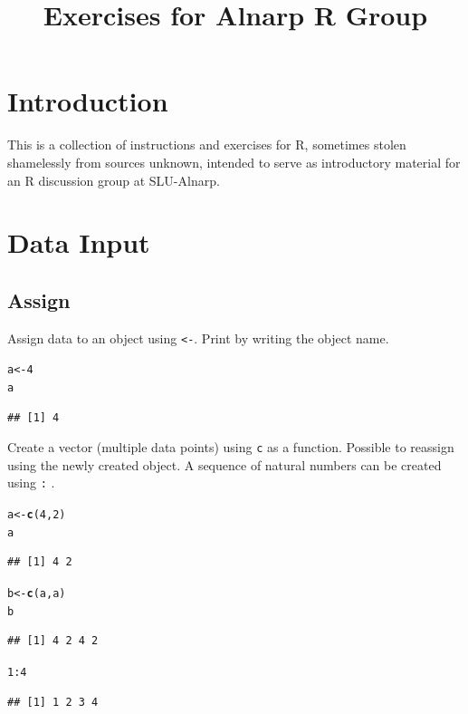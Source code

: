 \documentclass{article}\usepackage[]{graphicx}\usepackage[]{color}
\title{Exercises for Alnarp R Group}
\makeatletter
\newcommand{\hlnum}[1]{\textcolor[rgb]{0.686,0.059,0.569}{#1}}%
\newcommand{\hlopt}[1]{\textcolor[rgb]{0,0,0}{#1}}%
\newcommand{\hlstd}[1]{\textcolor[rgb]{0.345,0.345,0.345}{#1}}%
\newcommand{\hlkwb}[1]{\textcolor[rgb]{0.69,0.353,0.396}{#1}}%
\newcommand{\hlkwd}[1]{\textcolor[rgb]{0.737,0.353,0.396}{\textbf{#1}}}%
\newenvironment{kframe}{%
 \def\at@end@of@kframe{}%
 \ifinner\ifhmode%
  \def\at@end@of@kframe{\end{minipage}}%
  \begin{minipage}{\columnwidth}%
 \fi\fi%
 \def\FrameCommand##1{\hskip\@totalleftmargin \hskip-\fboxsep
 \colorbox{shadecolor}{##1}\hskip-\fboxsep
     \hskip-\linewidth \hskip-\@totalleftmargin \hskip\columnwidth}%
 \MakeFramed {\advance\hsize-\width
   \@totalleftmargin\z@ \linewidth\hsize
   \@setminipage}}%
 {\par\unskip\endMakeFramed%
 \at@end@of@kframe}
\newenvironment{knitrout}{}{} %
\makeatother
\begin{document}
\maketitle
\tableofcontents

\newpage

\section{Introduction}
This is a collection of instructions and exercises for R, sometimes stolen shamelessly from sources unknown, intended to serve as introductory material for an R discussion group at SLU-Alnarp.

\section{Data Input}
\subsection{Assign}
Assign data to an object using \texttt{<-}. Print by writing the object name.
\begin{knitrout}
\color{fgcolor}\begin{kframe}
\begin{alltt}
\hlstd{a} \hlkwb{<-} \hlnum{4}
\hlstd{a}
\end{alltt}
\begin{verbatim}
## [1] 4
\end{verbatim}
\end{kframe}
\end{knitrout}

Create a vector (multiple data points) using \texttt{c} as a function. Possible to reassign using the newly created object. A sequence of natural numbers can be created using \texttt{:} .
\begin{knitrout}
\color{fgcolor}\begin{kframe}
\begin{alltt}
\hlstd{a} \hlkwb{<-} \hlkwd{c}\hlstd{(}\hlnum{4}\hlstd{,} \hlnum{2}\hlstd{)}
\hlstd{a}
\end{alltt}
\begin{verbatim}
## [1] 4 2
\end{verbatim}
\begin{alltt}
\hlstd{b} \hlkwb{<-} \hlkwd{c}\hlstd{(a, a)}
\hlstd{b}
\end{alltt}
\begin{verbatim}
## [1] 4 2 4 2
\end{verbatim}
\begin{alltt}
\hlnum{1}\hlopt{:}\hlnum{4}
\end{alltt}
\begin{verbatim}
## [1] 1 2 3 4
\end{verbatim}
\end{kframe}
\end{knitrout}
\end{document}
